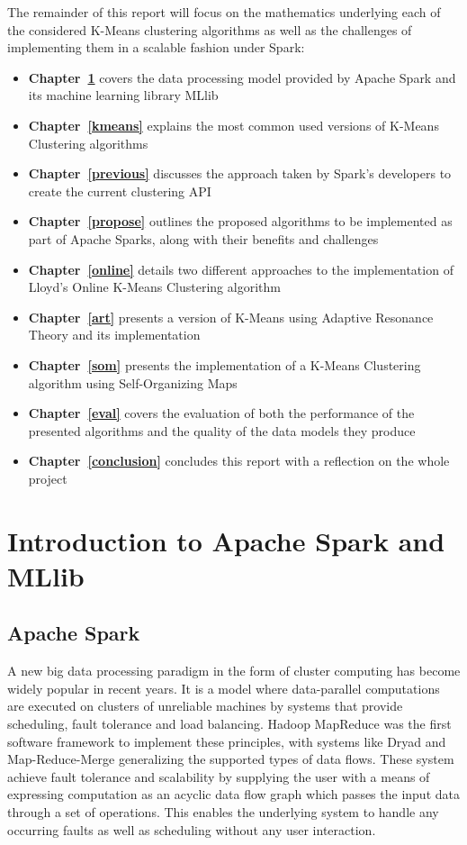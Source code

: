 \documentclass{l4proj}
\begin{document}
The remainder of this report will focus on the mathematics underlying each of the considered K-Means clustering algorithms as well as the challenges of implementing them in a scalable fashion under Spark:
\begin{itemize}
\item \textbf{Chapter~\ref{spark}} covers the data processing model provided by Apache Spark and its machine learning library MLlib
\item \textbf{Chapter~\ref{kmeans}} explains the most common used versions of K-Means Clustering algorithms
\item \textbf{Chapter~\ref{previous}} discusses the approach taken by Spark's developers to create the current clustering API
\item \textbf{Chapter~\ref{propose}} outlines the proposed algorithms to be implemented as part of Apache Sparks, along with their benefits and challenges
\item \textbf{Chapter~\ref{online}} details two different approaches to the implementation of Lloyd's Online K-Means Clustering algorithm
\item \textbf{Chapter~\ref{art}} presents a version of K-Means using Adaptive Resonance Theory and its implementation
\item \textbf{Chapter~\ref{som}} presents the implementation of a K-Means Clustering algorithm using Self-Organizing Maps
\item \textbf{Chapter~\ref{eval}} covers the evaluation of both the performance of the presented algorithms and the quality of the data models they produce
\item \textbf{Chapter~\ref{conclusion}} concludes this report with a reflection on the whole project
\end{itemize}


\chapter{Introduction to Apache Spark and MLlib}
\label{spark}
\section{Apache Spark}

A new big data processing paradigm in the form of cluster computing has become widely popular in recent years. It is a model where data-parallel computations are executed on clusters of unreliable machines by systems that provide scheduling, fault tolerance and load balancing\cite{Spark}. Hadoop MapReduce was the first software framework to implement these principles\cite{MapReduce}, with systems like Dryad\cite{Dryad} and Map-Reduce-Merge\cite{MRM} generalizing the supported types of data flows. These system achieve fault tolerance and scalability by supplying the user with a means of expressing computation as an acyclic data flow graph which passes the input data through a set of operations. This enables the underlying system to handle any occurring faults as well as scheduling without any user interaction.
\end{document}

